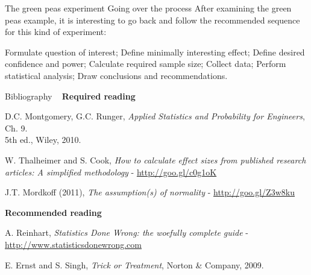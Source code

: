 \documentclass[t]{beamer}
\begin{document}

\begin{ftst}
{The green peas experiment}
{Going over the process}
After examining the green peas example, it is interesting to go back and follow the recommended sequence for this kind of experiment:

\bitems Formulate question of interest;
	\spitem Define minimally interesting effect;
	\spitem Define desired confidence and power;
	\spitem Calculate required sample size;
	\spitem Collect data;
	\spitem Perform statistical analysis;
	\spitem Draw conclusions and recommendations.
\eitem
{}
\end{ftst}



\begin{ftst}
{Bibliography}
{\ }
\scriptsize
\textbf{Required reading}

\benums D.C. Montgomery, G.C. Runger, \textit{Applied Statistics and Probability for Engineers}, Ch. 9.\\5th ed., Wiley, 2010. 
\item W. Thalheimer and S. Cook, \textit{How to calculate effect sizes from published research articles: A simplified methodology} - {\tiny\url{http://goo.gl/c0g1oK}}
\item J.T. Mordkoff (2011), \textit{The assumption(s) of normality} - \url{http://goo.gl/Z3w8ku}
\eenum

\textbf{Recommended reading}

\benums A. Reinhart, \textit{Statistics Done Wrong: the woefully complete guide} - {\tiny\url{http://www.statisticsdonewrong.com}}
\item E. Ernst and S. Singh, \textit{Trick or Treatment}, Norton \& Company, 2009.
\eenum
\end{ftst}

\end{document}

